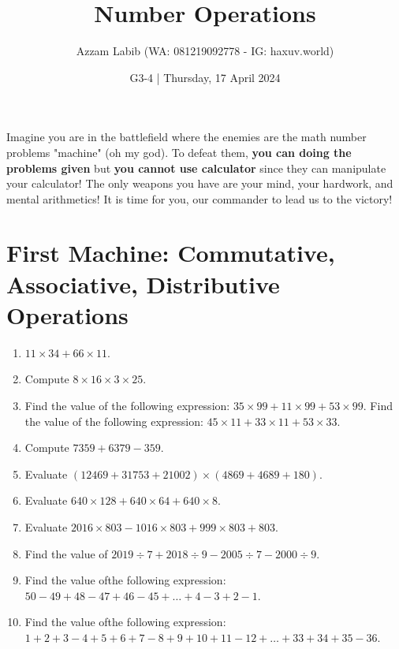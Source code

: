 \documentclass[11pt]{scrartcl}
\title{Number Operations}
\author{Azzam Labib (WA: 081219092778 - IG: haxuv.world)}
\date{G3-4 | Thursday, 17 April 2024}
\begin{document}
\maketitle
\begin{tcolorbox}[colback=blue!10,colframe=blue!75!black]
Imagine you are in the battlefield where the enemies are the math number problems "machine" (oh my god). To defeat them, \textbf{you can doing the problems given} but \textbf{you cannot use calculator} since they can manipulate your calculator! The only weapons you have are your mind, your hardwork, and mental arithmetics! It is time for you, our commander to lead us to the victory!
\end{tcolorbox}




\section{First Machine: Commutative, Associative, Distributive Operations}
\begin{enumerate}
\item $11 \times 34 + 66 \times 11$.
\item Compute $8 \times 16 \times 3 \times 25$.
\item Find the value of the following expression: $35 \times 99 + 11 \times 99 + 53 \times 99$.
Find the value of the following expression: $45 \times 11 + 33 \times 11 + 53 \times 33$.
\item Compute $7359 + 6379 - 359$.
\item Evaluate
$(12469+31753+21002) \times (4869+4689+180)$.
\item Evaluate $640 \times 128 + 640 \times 64 + 640 \times 8$.
\item Evaluate $2016 \times 803 - 1016 \times 803 + 999 \times 803 + 803$.
\item Find the value of $2019 \div 7 + 2018 \div 9 - 2005 \div 7 - 2000 \div 9$.
\item Find the value ofthe following expression:
$50-49+48-47+46-45+\dots+4-3+2-1$.
\item Find the value ofthe following expression:\\
$1+2+3-4+5+6+7-8+9+10+11-12+\dots+33+34+35-36$.
\end{enumerate}
\end{document}
